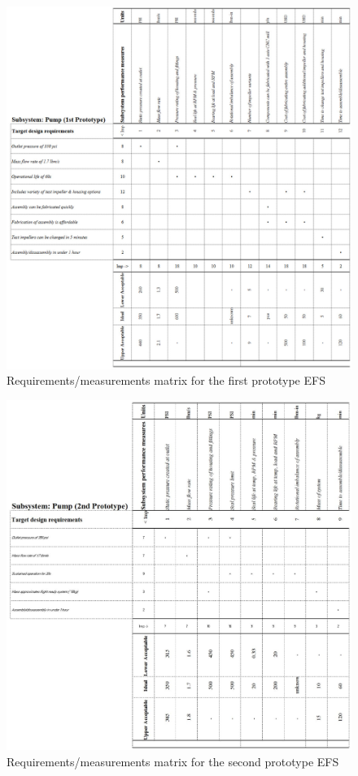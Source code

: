 \documentclass[11pt,twoside,a4paper,openright]{report}
\begin{document}
\begin{figure}[!h]
\begin{center}
\includegraphics[width=\textwidth]{1st_prototype_RM_matrix.jpg}
\caption{Requirements/measurements matrix for the first prototype EFS}
\end{center}
\end{figure}
\newpage
\begin{figure}[!h]
\begin{center}
\includegraphics[width=\textwidth]{2nd_prototype_RM_matrix.jpg}
\caption{Requirements/measurements matrix for the second prototype EFS}
\end{center}
\end{figure}
\end{document}
